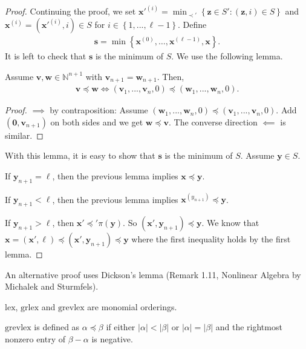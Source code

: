 \documentclass[a4paper, 11pt]{article}
\begin{document}
\begin{proof}
  Continuing the proof, we set \( \mathbf x'^{(i)} = \min_{\prec'}\left\{ \mathbf z \in S' : (\mathbf z, i) \in S \right\} \) and \( \mathbf x^{(i)} = (\mathbf x'^{(i)}, i) \in S \) for \( i \in \left\{ 1,...,\ell - 1 \right\} \). Define 
  \begin{align*}
    \mathbf s = \min\left\{ \mathbf x^{(0)},\dots,\mathbf x^{(\ell-1)}, \mathbf x  \right\}.
  \end{align*}
  It is left to check that \( \mathbf s \) is the minimum of \( S \). We use the following lemma.

  \begin{lemma*}
    Assume \(  \mathbf v, \mathbf w \in \mathbb N^{n+1 } \) with \( \mathbf v_{n+1} = \mathbf w_{n+1} \). Then, 
    \begin{align*}
      \mathbf v \preceq \mathbf w \iff (\mathbf v_1,...,\mathbf v_n,0) \preceq (\mathbf w_1,...,\mathbf w_n,0).
    \end{align*}
  \end{lemma*}
  \begin{proof}
    \( \implies \) by contraposition: Assume \(   (\mathbf w_1,...,\mathbf w_n,0) \preceq (\mathbf v_1,...,\mathbf v_n,0) \). Add \( (\mathbf 0,\mathbf v_{n+1}) \) on both sides and we get \(\mathbf  w \preceq \mathbf v \). The converse direction \( \impliedby \) is similar.
  \end{proof}
  With this lemma, it is easy to show that \( \mathbf s \) is the minimum of \( S \).  Assume \( \mathbf y  \in S \). 
  
  If \( \mathbf y_{n+1} = \ell \), then the previous lemma implies \( \mathbf x \preceq \mathbf y \). 
  
  If \( \mathbf y_{n+1} < \ell \), then the previous lemma implies \( \mathbf x^{(y_{n+1})} \preceq \mathbf y \). 
  
  If \( \mathbf y_{n+1} > \ell \), then \( \mathbf x' \preceq' \pi(\mathbf y) \). So \( (\mathbf x', \mathbf y_{n + 1}) \preceq \mathbf y \). We know that \( \mathbf x = (\mathbf x', \ell) \preceq (\mathbf x', \mathbf y_{n+1}) \preceq \mathbf y \) where the first inequality holds by the first lemma.
\end{proof}

An alternative proof uses Dickson's lemma (Remark 1.11, Nonlinear Algebra by Michalek and Sturmfels).

\begin{eg}
  \( \mathrm{lex} \), \( \mathrm{grlex} \) and \( \mathrm{grevlex} \) are monomial orderings.

  \( \mathrm{grevlex} \) is defined as \( \alpha \preceq \beta \) if either \( |\alpha| < |\beta| \) or \( |\alpha| = |\beta| \) and the rightmost nonzero entry of \( \beta - \alpha \) is negative.
\end{eg}
\end{document}
